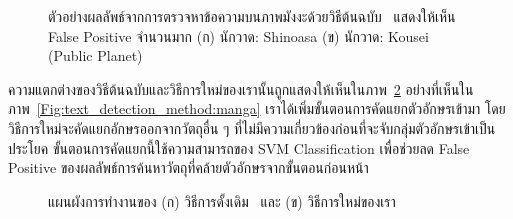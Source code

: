 \begin{figure}[!h]
    \centering
    \caption{ตัวอย่างผลลัพธ์จากการตรวจหาข้อความบนภาพมังงะด้วยวิธีต้นฉบับ~\cite{5540041} แสดงให้เห็น False Positive จำนวนมาก (ก) นักวาด: Shinoasa (ข) นักวาด: Kousei (Public Planet)}
    \label{Fig:similar}
\end{figure}

ความแตกต่างของวิธีต้นฉบับและวิธีการใหม่ของเรานั้นถูกแสดงให้เห็นในภาพ~\ref{Fig:text_detection_method} อย่างที่เห็นในภาพ~\ref{Fig:text_detection_method:manga}  เราได้เพิ่มขั้นตอนการคัดแยกตัวอักษรเข้ามา โดยวิธีการใหม่จะคัดแยกอักษรออกจากวัตถุอื่น ๆ ที่ไม่มีความเกี่ยวข้องก่อนที่จะจับกลุ่มตัวอักษรเข้าเป็นประโยค ขั้นตอนการคัดแยกนี้ใช้ความสามารถของ SVM Classification เพื่อช่วยลด False Positive ของผลลัพธ์การค้นหาวัตถุที่คล้ายตัวอักษรจากขั้นตอนก่อนหน้า

\begin{figure}[!h]
    \centering
    \caption{แผนผังการทำงานของ (ก) วิธีการดั้งเดิม~\cite{5540041} และ (ข) วิธีการใหม่ของเรา}
    \label{Fig:text_detection_method}
\end{figure}

